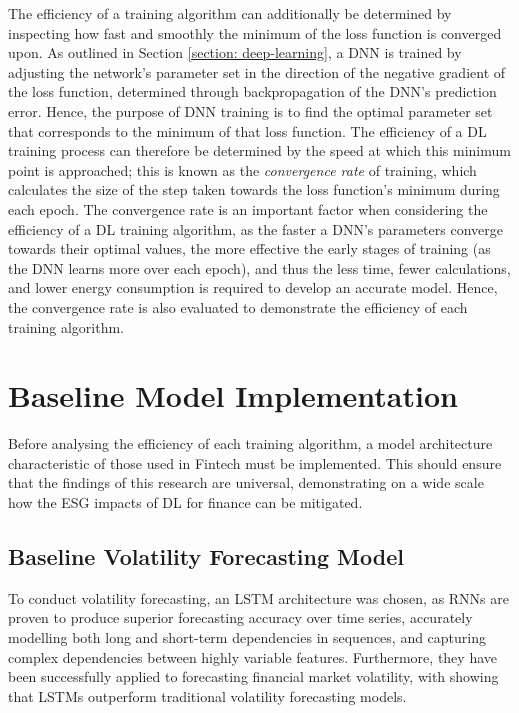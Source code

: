 \documentclass[a4paper, 11pt]{report}
\begin{document}
    The efficiency of a training algorithm can additionally be determined by inspecting how fast and smoothly the minimum of the loss function is converged upon. As outlined in Section \ref{section: deep-learning}, a DNN is trained by adjusting the network's parameter set in the direction of the negative gradient of the loss function, determined through backpropagation of the DNN's prediction error. Hence, the purpose of DNN training is to find the optimal parameter set that corresponds to the minimum of that loss function. The efficiency of a DL training process can therefore be determined by the speed at which this minimum point is approached; this is known as the \emph{convergence rate} of training, which calculates the size of the step taken towards the loss function's minimum during each epoch. The convergence rate is an important factor when considering the efficiency of a DL training algorithm, as the faster a DNN's parameters converge towards their optimal values, the more effective the early stages of training (as the DNN learns more over each epoch), and thus the less time, fewer calculations, and lower energy consumption is required to develop an accurate model. Hence, the convergence rate is also evaluated to demonstrate the efficiency of each training algorithm.


    \section{Baseline Model Implementation}
    \label{section: baseline}

    Before analysing the efficiency of each training algorithm, a model architecture characteristic of those used in Fintech must be implemented. This should ensure that the findings of this research are universal, demonstrating on a wide scale how the ESG impacts of DL for finance can be mitigated.
    

    \subsection{Baseline Volatility Forecasting Model}
    \label{section: model-architecture}

    To conduct volatility forecasting, an LSTM architecture was chosen, as RNNs are proven to produce superior forecasting accuracy over time series, accurately modelling both long and short-term dependencies in sequences, and capturing complex dependencies between highly variable features. Furthermore, they have been successfully applied to forecasting financial market volatility, with \citet{bucci-2020} showing that LSTMs outperform traditional volatility forecasting models.
\end{document}
